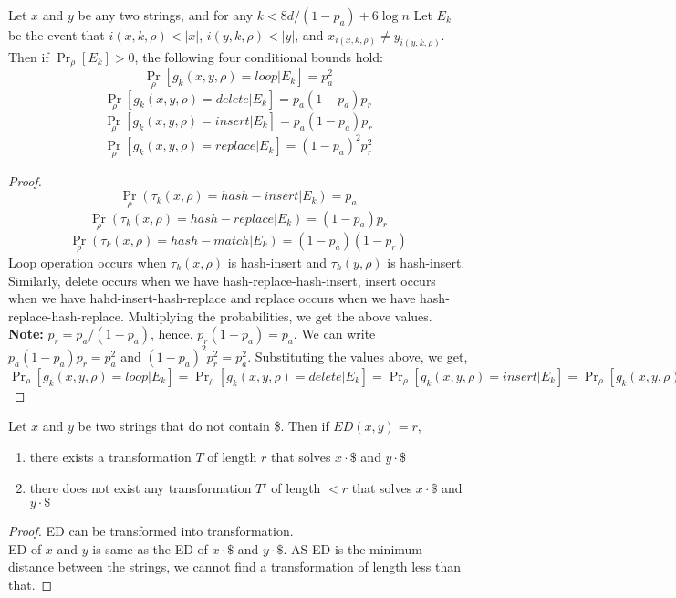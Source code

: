 \documentclass{article}
\begin{document}
\begin{lem}
    Let $x$ and $y$ be any two strings, and for any $k<8d/(1-p_a)+6\log n$ Let
    $E_k$ be  the event that $i(x,k,\rho)<|x|$, $i(y,k,\rho)<|y|$, and 
    $x_{i(x,k,\rho)} \ne y_{i(y,k,\rho)}$. Then if $\Pr_\rho [E_k]>0$, the 
    following four conditional bounds hold:
    $$\Pr_\rho[g_k(x,y,\rho)=loop|E_k]=p_a^2$$
    $$\Pr_\rho[g_k(x,y,\rho)=delete|E_k]=p_a(1-p_a)p_r$$
    $$\Pr_\rho[g_k(x,y,\rho)=insert|E_k]=p_a(1-p_a)p_r$$
    $$\Pr_\rho[g_k(x,y,\rho)=replace|E_k]=(1-p_a)^2p_r^2$$
\end{lem}
\begin{proof}
    $$\Pr_\rho(\tau_k(x,\rho)=hash-insert|E_k)=p_a$$
    $$\Pr_\rho(\tau_k(x,\rho)=hash-replace|E_k)=(1-p_a)p_r$$
    $$\Pr_\rho(\tau_k(x,\rho)=hash-match|E_k)=(1-p_a)(1-p_r)$$
    Loop operation occurs when $\tau_k(x,\rho)$ is hash-insert and 
    $\tau_k(y,\rho)$ is hash-insert. Similarly, delete occurs when we have 
    hash-replace-hash-insert, insert occurs when we have hahd-insert-hash-replace
    and replace occurs when we have hash-replace-hash-replace.
    Multiplying the probabilities, we get the above values.\\
    \textbf{Note: }$p_r=p_a/(1-p_a)$, hence, $p_r(1-p_a)=p_a$. We can write 
    $p_a(1-p_a)p_r=p_a^2$ and $(1-p_a)^2p_r^2=p_a^2$. Substituting the values
    above, we get, $\Pr_\rho[g_k(x,y,\rho)=loop|E_k]=\Pr_\rho[g_k(x,y,\rho)=delete|E_k]
    =\Pr_\rho[g_k(x,y,\rho)=insert|E_k]=\Pr_\rho[g_k(x,y,\rho)=replace|E_k]=p_a^2$
\end{proof}

\begin{lem}
    Let $x$ and $y$ be two strings that do not contain \$. Then if $ED(x,y)=r$,
    \begin{enumerate}
        \item there exists a transformation $T$ of length $r$ that solves $x\cdot\$$
        and $y\cdot\$$
        \item there does not exist any transformation $T'$ of length $<r$ that 
        solves $x\cdot\$$ and $y\cdot\$$
    \end{enumerate}
\end{lem}
\begin{proof}
    ED can be transformed into transformation. \\
    ED of $x$ and $y$ is same as the ED of $x\cdot\$$ and $y\cdot\$$. AS ED is 
    the minimum distance between the strings, we cannot find a transformation
    of length less than that.
\end{proof}
\end{document}
